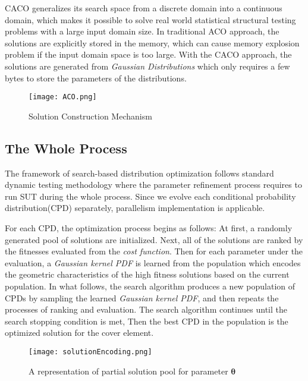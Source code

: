 \documentclass[journal]{IEEEtran}
\renewcommand{\vec}[1]{\mathbf{#1}}
\begin{document}
CACO generalizes its search space from a discrete domain into a continuous domain, which makes it possible to solve real world statistical structural testing problems with a large input domain size. In traditional ACO approach, the solutions are explicitly stored in the memory, which can cause memory explosion problem if the input domain space is too large. With the CACO approach, the solutions are generated from \emph{Gaussian Distributions} which only requires a few bytes to store the parameters of the distributions. %

\begin{figure}[t]
	\hspace*{0.2cm}
	\texttt{[image: ACO.png]}
	\caption{Solution Construction Mechanism}
	\label{fig:antGraph}
\end{figure} 

\subsection{The Whole Process}
The framework of search-based distribution optimization follows standard dynamic testing methodology where the parameter refinement process requires to run SUT during the whole process. Since we evolve each conditional probability distribution(CPD) separately, parallelism implementation is applicable. 

For each CPD, the optimization process begins as follows: At first, a randomly generated pool of solutions are initialized. Next, all of the solutions are ranked by the fitnesses evaluated from the \emph{cost function}. Then for each parameter under the evaluation, a \emph{Gaussian kernel PDF} is learned from the population which encodes the geometric characteristics of the high fitness solutions based on the current population. In what follows, the search algorithm produces a new population of CPDs by sampling the learned \emph{Gaussian kernel PDF}, and then repeats the processes of ranking and evaluation. The search algorithm continues until the search stopping condition is met, Then the best CPD in the population is the optimized solution for the cover element.
\begin{figure}[t]
	\hspace*{0.2cm}
	\texttt{[image: solutionEncoding.png]}
	\caption{A representation of partial solution pool for parameter \(\vec{\theta}\)}
	\label{fig:solutionEncoding}
\end{figure} 
\end{document}
